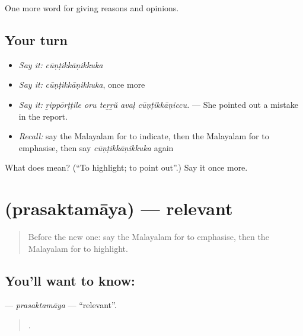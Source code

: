 \begin{grammarlens}[title={What you've built}]
One more word for giving reasons and opinions.
\end{grammarlens}

\subsection*{Your turn}
\begin{itemize}
\raggedright
  \item \emph{Say it:} \emph{cūṇṭikkāṇikkuka}
  \item \emph{Say it:} \emph{cūṇṭikkāṇikkuka}, once more
  \item \emph{Say it:} \emph{ṟippōrṭṭile oru teṟṟŭ avaḷ cūṇṭikkāṇiccu.} — She pointed out a mistake in the report.
  \item \emph{Recall:} say the Malayalam for to indicate, then the Malayalam for to emphasise, then say \emph{cūṇṭikkāṇikkuka} again
\end{itemize}

\begin{tcolorbox}[breakable,colback=teal!4,colframe=teal!35!black,title={Before you move on}]
What does  mean? (\textquotedblleft{}To highlight; to point out\textquotedblright{}.) Say it once more.
\end{tcolorbox}
\section[\texorpdfstring{\ml{പ്രസക്തമായ} (prasaktamāya)}{പ്രസക്തമായ (prasaktamāya)}]{ (prasaktamāya) — relevant}

\label{lesson:ML-C410-prasaktamaya}



\begin{quote}
Before the new one: say the Malayalam for to emphasise, then the Malayalam for to highlight.
\end{quote}

\subsection*{You'll want to know: }
\textbf{} — \emph{prasaktamāya} — \textquotedblleft{}relevant\textquotedblright{}.

\begin{quote}
    .
\end{quote}


